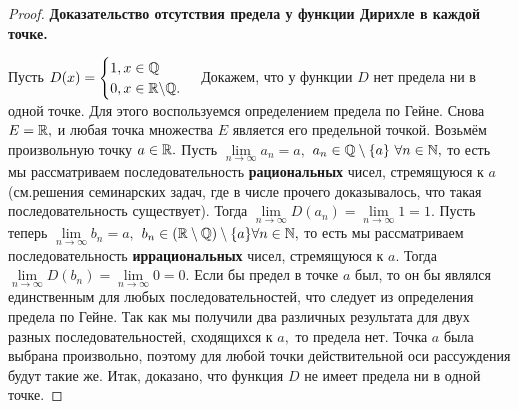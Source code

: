 \begin{proof}  \textbf{Доказательство отсутствия предела у функции Дирихле в каждой точке. }

    Пусть $
        D(x) =
        \begin{cases}
            1, x \in \mathbb{Q} \\
            0, x \in \mathbb{R}\backslash\mathbb{Q}.
        \end{cases}
    $
    Докажем, что у функции $D$ нет предела
    ни в одной точке. Для этого воспользуемся
    определением предела по Гейне.
    Снова $E=\mathbb{R},$ и любая точка
    множества $E$ является его предельной точкой.
    Возьмём произвольную точку $a\in\mathbb{R}.$
    Пусть $\lim\limits_{n\rightarrow\infty}a_n=a,$
    $a_n \in \mathbb{Q}\setminus\{a\} \ \forall n \in \mathbb{N},$
    то есть мы рассматриваем последовательность
    \textbf{рациональных} чисел, стремящуюся к $a$
    (см.решения семинарских задач, где в числе
    прочего доказывалось, что такая последовательность
    существует). Тогда
    $\lim\limits_{n\rightarrow\infty}D(a_n)=
        \lim\limits_{n\rightarrow\infty}1=1.$
    Пусть теперь
    $\lim\limits_{n\rightarrow\infty}b_n=a,$
    $b_n \in (\mathbb{R}\setminus\mathbb{Q})
        \setminus\{a\}\forall n \in \mathbb{N},$
    то есть мы рассматриваем последовательность
    \textbf{иррациональных} чисел, стремящуюся к $a.$
    Тогда
    $\lim\limits_{n\rightarrow\infty}D(b_n)=
        \lim\limits_{n\rightarrow\infty}0=0.$
    Если бы предел в точке $a$ был, то
    он бы являлся единственным для любых
    последовательностей, что следует из определения
    предела по Гейне. Так как мы получили два
    различных результата для двух
    разных последовательностей, сходящихся
    к $a,$ то предела нет. Точка $a$ была выбрана
    произвольно, поэтому для любой точки
    действительной оси рассуждения будут
    такие же. Итак, доказано, что функция
    $D$ не имеет предела ни в одной точке.
\end{proof}

